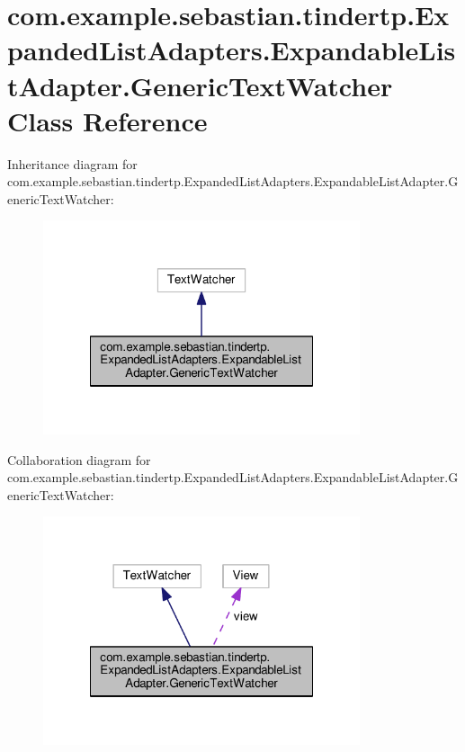 \hypertarget{classcom_1_1example_1_1sebastian_1_1tindertp_1_1ExpandedListAdapters_1_1ExpandableListAdapter_1_1GenericTextWatcher}{}\section{com.\+example.\+sebastian.\+tindertp.\+Expanded\+List\+Adapters.\+Expandable\+List\+Adapter.\+Generic\+Text\+Watcher Class Reference}
\label{classcom_1_1example_1_1sebastian_1_1tindertp_1_1ExpandedListAdapters_1_1ExpandableListAdapter_1_1GenericTextWatcher}


Inheritance diagram for com.\+example.\+sebastian.\+tindertp.\+Expanded\+List\+Adapters.\+Expandable\+List\+Adapter.\+Generic\+Text\+Watcher\+:
\nopagebreak
\begin{figure}[H]
\begin{center}
\leavevmode
\includegraphics[width=264pt]{classcom_1_1example_1_1sebastian_1_1tindertp_1_1ExpandedListAdapters_1_1ExpandableListAdapter_1_dabde94790e27808f1220b6d1f1ba82b}
\end{center}
\end{figure}


Collaboration diagram for com.\+example.\+sebastian.\+tindertp.\+Expanded\+List\+Adapters.\+Expandable\+List\+Adapter.\+Generic\+Text\+Watcher\+:
\nopagebreak
\begin{figure}[H]
\begin{center}
\leavevmode
\includegraphics[width=264pt]{classcom_1_1example_1_1sebastian_1_1tindertp_1_1ExpandedListAdapters_1_1ExpandableListAdapter_1_fc9d59b03808abf864ac210bfc314697}
\end{center}
\end{figure}
